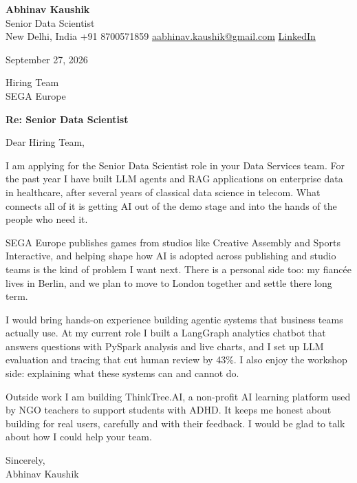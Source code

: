 \documentclass[11pt,a4paper]{article}
\begin{document}
{\Large\bfseries Abhinav Kaushik}\\
Senior Data Scientist\\
New Delhi, India \textbar{} +91 8700571859 \textbar{} \href{mailto:aabhinav.kaushik@gmail.com}{aabhinav.kaushik@gmail.com} \textbar{} \href{https://www.linkedin.com/in/abhinav-kaushik10/}{LinkedIn}  

September 27, 2026

Hiring Team\\
SEGA Europe

\textbf{Re: Senior Data Scientist}

Dear Hiring Team,

I am applying for the Senior Data Scientist role in your Data Services team. For the past year I have built LLM agents and RAG applications on enterprise data in healthcare, after several years of classical data science in telecom. What connects all of it is getting AI out of the demo stage and into the hands of the people who need it.

SEGA Europe publishes games from studios like Creative Assembly and Sports Interactive, and helping shape how AI is adopted across publishing and studio teams is the kind of problem I want next. There is a personal side too: my fiancée lives in Berlin, and we plan to move to London together and settle there long term.

I would bring hands-on experience building agentic systems that business teams actually use. At my current role I built a LangGraph analytics chatbot that answers questions with PySpark analysis and live charts, and I set up LLM evaluation and tracing that cut human review by 43\%. I also enjoy the workshop side: explaining what these systems can and cannot do.

Outside work I am building ThinkTree.AI, a non-profit AI learning platform used by NGO teachers to support students with ADHD. It keeps me honest about building for real users, carefully and with their feedback. I would be glad to talk about how I could help your team.

Sincerely,\\[4pt]
Abhinav Kaushik
\end{document}
